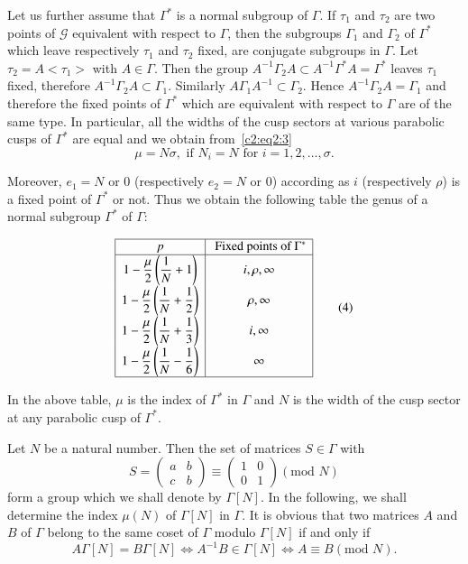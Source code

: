 Let us further assume that $\Gamma^{\ast}$ is a normal subgroup of
$\Gamma$. If $\tau_1$ and $\tau_2$ are two points of $\mathscr{G}$
equivalent with respect to $\Gamma$, then the subgroups $\Gamma_1$ and
$\Gamma_2$ of $\Gamma^{\ast}$ which leave respectively $\tau_1$ and
$\tau_2$ fixed, are conjugate subgroups in $\Gamma$. Let
$\tau_2=A<\tau_1>$ with $A\in \Gamma$. Then the group $A^{-1}
\Gamma_2 A \subset A^{-1} \Gamma^{\ast} A = \Gamma^{\ast}$ leaves
$\tau_1$ fixed, therefore $A^{-1}\Gamma_2 A \subset
\Gamma_1$. Similarly $A\Gamma_1 A^{-1}\subset \Gamma_2$. Hence $A^{-1}
\Gamma_2 A = \Gamma_1$ and therefore the fixed points of
$\Gamma^{\ast}$ which are equivalent with respect to $\Gamma$ are of
the same type. In particular, all the widths of the cusp sectors at
various parabolic cusps of $\Gamma^{\ast}$ are equal and we obtain
from~\ref{c2:eq2:3}
$$
\mu = N \sigma, \text{ if } N_i = N \text{ for } i = 1, 2, \ldots, \sigma.
$$

Moreover, $e_1=N$ or $0$ (respectively $e_2=N$ or 0) according as $i$
(respectively $\rho$) is a fixed point of $\Gamma^{\ast}$ or
not. Thus we obtain the following table the genus of a normal
subgroup $\Gamma^{\ast}$ of $\Gamma$: 
\begin{center}
\begin{equation*}
\begin{array}{|c|c|}
    \hline
    p   & \mbox{ Fixed points of } \Gamma^{\ast}\\
    \hline
1 -\dfrac{\mu}{2}  \left(\dfrac{1}{N}+1\right) & i, \rho, \infty\\[5pt]
1 -\dfrac{\mu}{2}  \left(\dfrac{1}{N}+\dfrac{1}{2}\right) & \rho,
    \infty\\[5pt]
1 -\dfrac{\mu}{2}  \left(\dfrac{1}{N}+\dfrac{1}{3}\right) & i,
    \infty\\[5pt]
1 -\dfrac{\mu}{2}  \left(\dfrac{1}{N}-\dfrac{1}{6}\right) &
    \infty\\[5pt]
    \hline
\end{array}\tag{4}\label{c2:eq2:4}
\end{equation*}
\end{center}\pageoriginale 

In the above table, $\mu$ is the index of $\Gamma^{\ast}$ in $\Gamma$
and $N$ is the width of the cusp sector at any parabolic cusp of
$\Gamma^{\ast}$. 

Let $N$ be a natural number. Then the set of matrices $S\in
\Gamma$ with 
$$
S = \begin{pmatrix}
a&b\\c&b
\end{pmatrix} \equiv \begin{pmatrix}
1& 0\\
0 &1
\end{pmatrix} (\text{mod } N)
$$
form a group which we shall denote by $\Gamma[N]$. In the following,
we shall determine the index $\mu(N)$ of $\Gamma[N]$ in $\Gamma$. It
is obvious that two matrices $A$ and $B$ of $\Gamma$ belong to the
same coset of $\Gamma$ modulo $\Gamma[N]$ if and only if 
$$
A\Gamma[N] = B\Gamma[N] \Longleftrightarrow A^{-1} B \in
\Gamma[N] \Longleftrightarrow A\equiv B (\text{mod } N).
$$

